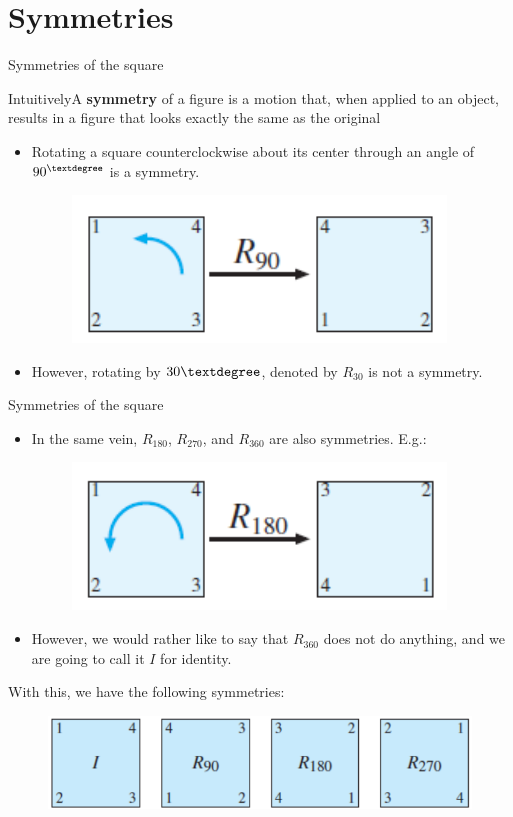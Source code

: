 \documentclass{beamer}
\def\bl[#1]#2{\begin{block}{#1}#2\end{block}}
\def\itemb{\begin{itemize}}
\def\iteme{\end{itemize}}
\begin{document}
\section{Symmetries}

\begin{frame}{Symmetries of the square}
\bl[Intuitively]{A \textbf{symmetry} of a figure is a motion that, when applied to an object, results in a figure that looks exactly the same as the original}
\itemb
\item Rotating a square counterclockwise about its center through an angle of $90^{\textdegree}$ is a symmetry.
\begin{figure}
\centering
\includegraphics[scale=1]{R90.pdf}
\end{figure}
\item However, rotating by $30\textdegree$, denoted by $R_{30}$ is not a symmetry.
\iteme
\end{frame}

\begin{frame}{Symmetries of the square}
\itemb
\item In the same vein, $R_{180}$, $R_{270}$, and $R_{360}$ are also symmetries. E.g.:
\begin{figure}
\centering
\includegraphics[scale=1]{R180.pdf}
\end{figure}
\item However, we would rather like to say that $R_{360}$ does not do anything, and we are going to call it $I$ for identity.
\iteme
With this, we have the following symmetries:
\begin{figure}
\centering
\includegraphics[scale=0.8]{Rotations.pdf}
\end{figure}

\end{frame}
\end{document}
